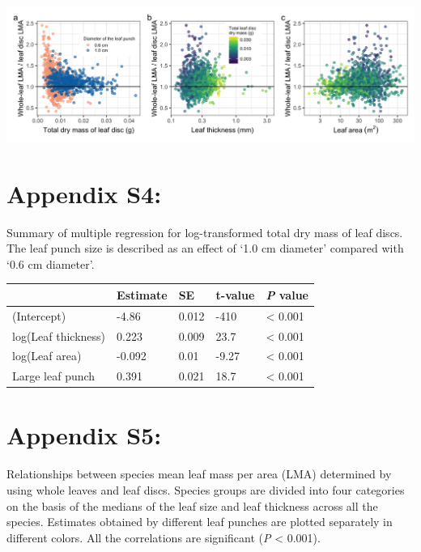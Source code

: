 \documentclass[
  12pt,
  a4paper,
,tablecaptionabove
]{scrartcl}
\begin{document}
\includegraphics{../figs/LMAratio2.png}

\newpage

\hypertarget{appendix-s4}{%
\section{Appendix S4:}\label{appendix-s4}}

Summary of multiple regression for log-transformed total dry mass of
leaf discs. The leaf punch size is described as an effect of `1.0 cm
diameter' compared with `0.6 cm diameter'.

\begin{longtable}[]{@{}lllll@{}}
\toprule
& Estimate & SE & t-value & \emph{P} value \\
\midrule
\endhead
(Intercept) & -4.86 & 0.012 & -410 & \textless{} 0.001 \\
log(Leaf thickness) & 0.223 & 0.009 & 23.7 & \textless{} 0.001 \\
log(Leaf area) & -0.092 & 0.01 & -9.27 & \textless{} 0.001 \\
Large leaf punch & 0.391 & 0.021 & 18.7 & \textless{} 0.001 \\
\bottomrule
\end{longtable}

\newpage

\hypertarget{appendix-s5}{%
\section{Appendix S5:}\label{appendix-s5}}

Relationships between species mean leaf mass per area (LMA) determined
by using whole leaves and leaf discs. Species groups are divided into
four categories on the basis of the medians of the leaf size and leaf
thickness across all the species. Estimates obtained by different leaf
punches are plotted separately in different colors. All the correlations
are significant (\emph{P} \textless{} 0.001).
\end{document}
